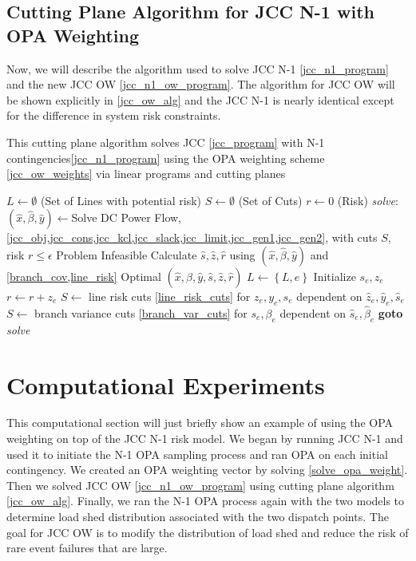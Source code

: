 \subsection{Cutting Plane Algorithm for JCC N-1 with OPA Weighting}
Now, we will describe the algorithm used to solve  JCC N-1 \cref{jcc_n1_program} and the new JCC OW \cref{jcc_n1_ow_program}.  The algorithm for JCC OW will be shown explicitly in \cref{jcc_ow_alg} and the JCC N-1 is nearly identical except for the difference in system risk constraints.
\begin{algorithm}
\caption[Cutting plane algorithm for solving JCC N-1 with OPA weighting]{This cutting plane algorithm solves JCC \cref{jcc_program} with N-1 contingencies\cref{jcc_n1_program} using the OPA weighting scheme \cref{jcc_ow_weights} via linear programs and cutting planes}\label{jcc_ow_alg}
\begin{algorithmic}
\State $L \gets \emptyset$  (Set of Lines with potential risk)
\State $S \gets \emptyset$  (Set of Cuts)
\State $r \gets 0$ (Risk)
\BState \emph{solve}:
\State $(\hat{x},\hat{\beta},\hat{y}) \gets $Solve DC Power Flow, \cref{jcc_obj,jcc_cons,jcc_kcl,jcc_slack,jcc_limit,jcc_gen1,jcc_gen2}, with cuts $S$, risk $r\leq\epsilon$
 \Return Problem Infeasible 
\EndIf
\State Calculate $\hat{s},\hat{z},\hat{r}$ using $(\hat{x},\hat{\beta},\hat{y})$ and \cref{branch_cov,line_risk}
 \Return Optimal $(\hat{x},\hat{\beta},\hat{y},\hat{s},\hat{z},\hat{r})$
\EndIf
{}
            \State $L \gets \left\{L,e\right\}$
            \State Initialize $s_e,z_e$
            \State $r \gets r + z_e$
    \EndIf            
    \State $S \gets$ line risk cuts \cref{line_risk_cuts} for $z_e,y_e,s_e$ dependent on $\hat{z}_e,\hat{y}_e,\hat{s}_e$
    \State $S \gets$ branch variance cuts \cref{branch_var_cuts} for $s_e,\beta_e$ dependent on $\hat{s}_e,\hat{\beta}_e$
\EndIf
\EndFor
\State \textbf{goto} \emph{solve}
\EndProcedure
\end{algorithmic}
\end{algorithm}



\section{Computational Experiments}
This computational section will just briefly show an example of using the OPA weighting on top of the JCC N-1 risk model. We began by  running JCC N-1 and used it to initiate the N-1 OPA sampling process and ran OPA on each initial contingency.  We created an OPA weighting vector by solving \cref{solve_opa_weight}.  Then we solved JCC OW \cref{jcc_n1_ow_program} using cutting plane algorithm \cref{jcc_ow_alg}.  Finally, we ran the N-1 OPA process again with the two models to determine load shed distribution associated with the two dispatch points.   The goal for JCC OW is to modify the distribution of load shed and reduce the risk of rare event failures that are large.  

